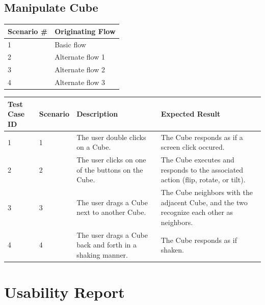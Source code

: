 \documentclass[12pt]{article}
\begin{document}
\clearpage

\subsection{Manipulate Cube}

\begin{table}[h!]
  \begin{tabular}{l | l}
    \textbf{Scenario \#} &
    \textbf{Originating Flow} \\ \hline

    1 &
    Basic flow \\ \hline

    2 &
    Alternate flow 1 \\ \hline

    3 &
    Alternate flow 2 \\ \hline

    4 &
    Alternate flow 3 \\ \hline

  \end{tabular}
\end{table}

\begin{table}[h!]
  \begin{tabular}{p{.5in} | p{.75in} | p{2.15in} | p{2.15in}}
    \textbf{Test Case ID} &
    \textbf{Scenario} &
    \textbf{Description} &
    \textbf{Expected Result} \\ \hline

    1 &
    1 &
    The user double clicks on a Cube. &
    The Cube responds as if a screen click occured. \\ \hline

    2 &
    2 &
    The user clicks on one of the buttons on the Cube. &
    The Cube executes and responds to the associated action (flip, rotate, or tilt). \\ \hline

    3 &
    3 &
    The user drags a Cube next to another Cube. &
    The Cube neighbors with the adjacent Cube, and the two recognize each other as neighbors. \\ \hline

    4 &
    4 &
    The user drags a Cube back and forth in a shaking manner. &
    The Cube responds as if shaken. \\ \hline

  \end{tabular}
\end{table}

\section{Usability Report}
\end{document}
